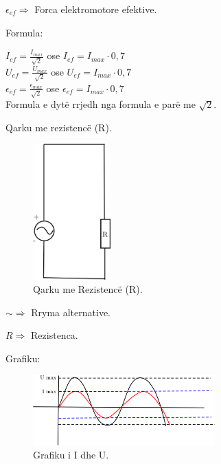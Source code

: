 \documentclass[twocolumn]{article}
\begin{document}
	$\epsilon_{ef} \Rightarrow$ Forca elektromotore efektive.\\
	
	
	\begin{center}
		Formula:
	\end{center}
	
	$I_{ef}=\frac{I_{max}}{\sqrt{2}}$ ose $I_{ef}=I_{max} \cdot 0,7$\\
	
	$U_{ef}=\frac{U_{max}}{\sqrt{2}}$ ose $U_{ef}=I_{max} \cdot 0,7$\\
	
	$\epsilon_{ef}=\frac{\epsilon_{max}}{\sqrt{2}}$ ose $\epsilon_{ef}=I_{max} \cdot 0,7$\\
	
	Formula e dytë rrjedh nga formula e parë me $\sqrt{2}$.\\
	
	
	\begin{center}
		Qarku me rezistencë (R).
	\end{center}
	
	\begin{figure}[h]
		\includegraphics[width=30mm]{Imazhet/Qarku R.png}
		\caption{Qarku me Rezistencë (R).}
		\label{fig:boat1}
	\end{figure}
	
	$ \sim \Rightarrow $ Rryma alternative.
	
	$R \Rightarrow $ Rezistenca.
	
	\begin{center}
		Grafiku:
	\end{center}
	
	\begin{figure}[h]
		\includegraphics[width=70mm]{Imazhet/Grafik R.png}
		\caption{Grafiku i I  dhe U.}
		\label{fig:boat1}
	\end{figure}
	
\end{document}
